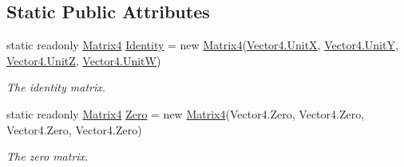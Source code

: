 \subsection*{Static Public Attributes}
\begin{DoxyCompactItemize}
\item 
static readonly \hyperlink{struct_open_t_k_1_1_matrix4}{Matrix4} \hyperlink{struct_open_t_k_1_1_matrix4_a6f7b2f68ab7b7bce17ef850f6b2be3fb}{Identity} = new \hyperlink{struct_open_t_k_1_1_matrix4}{Matrix4}(\hyperlink{struct_open_t_k_1_1_vector4_ad3b78911d7b6438c95ec666d49698487}{Vector4.\-Unit\-X}, \hyperlink{struct_open_t_k_1_1_vector4_a1396b403dd251cb508210d93751494e5}{Vector4.\-Unit\-Y}, \hyperlink{struct_open_t_k_1_1_vector4_ad269575f7cc9936e91f79f89c3fb1b48}{Vector4.\-Unit\-Z}, \hyperlink{struct_open_t_k_1_1_vector4_ac56f2979d015c23002983614a97b3226}{Vector4.\-Unit\-W})
\begin{DoxyCompactList}\small\item\em The identity matrix. \end{DoxyCompactList}\item 
static readonly \hyperlink{struct_open_t_k_1_1_matrix4}{Matrix4} \hyperlink{struct_open_t_k_1_1_matrix4_a412c6bab3385cf1c7f84587cb413a7cf}{Zero} = new \hyperlink{struct_open_t_k_1_1_matrix4}{Matrix4}(Vector4.\-Zero, Vector4.\-Zero, Vector4.\-Zero, Vector4.\-Zero)
\begin{DoxyCompactList}\small\item\em The zero matrix. \end{DoxyCompactList}\end{DoxyCompactItemize}
